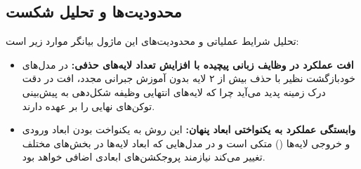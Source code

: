 \subsection{محدودیت‌ها و تحلیل شکست}
تحلیل شرایط عملیاتی و محدودیت‌های این ماژول بیانگر موارد زیر است:
\begin{itemize}
    \item \textbf{افت عملکرد در وظایف زبانی پیچیده با افزایش تعداد لایه‌های حذفی:} در مدل‌های خودبازگشت نظیر  با حذف بیش از ۲ لایه بدون آموزش جبرانی مجدد، افت در دقت درک زمینه پدید می‌آید چرا که لایه‌های انتهایی وظیفه شکل‌دهی به پیش‌بینی توکن‌های نهایی را بر عهده دارند.
    \item \textbf{وابستگی عملکرد به یکنواختی ابعاد پنهان:} این روش به یکنواخت بودن ابعاد ورودی و خروجی لایه‌ها () متکی است و در مدل‌هایی که ابعاد لایه‌ها در بخش‌های مختلف تغییر می‌کند نیازمند پروجکشن‌های ابعادی اضافی خواهد بود.
\end{itemize}
